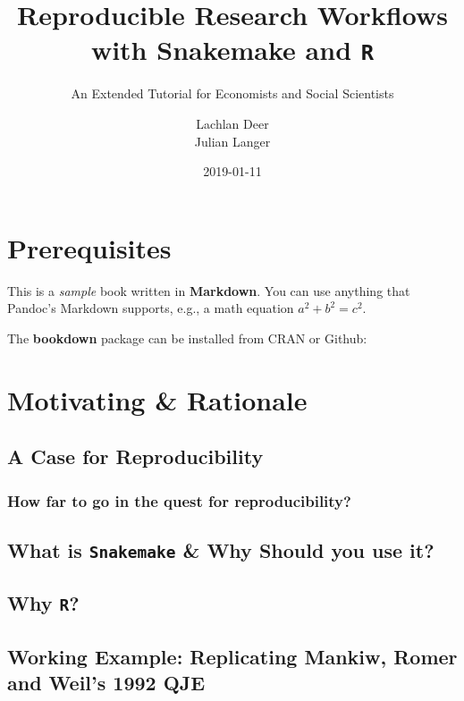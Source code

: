 \documentclass[]{book}
\title{Reproducible Research Workflows with Snakemake and \texttt{R}}
\subtitle{An Extended Tutorial for Economists and Social Scientists}
\author{Lachlan Deer \\ Julian Langer}
\date{2019-01-11}
\theoremstyle{definition}
\theoremstyle{definition}
\theoremstyle{definition}
\theoremstyle{remark}
\begin{document}
\maketitle

{
\setcounter{tocdepth}{1}
\tableofcontents
}
\chapter*{Prerequisites}\label{prerequisites}

This is a \emph{sample} book written in \textbf{Markdown}. You can use
anything that Pandoc's Markdown supports, e.g., a math equation
\(a^2 + b^2 = c^2\).

The \textbf{bookdown} package can be installed from CRAN or Github:

\chapter{Motivating \& Rationale}\label{intro}

\section{A Case for Reproducibility}\label{a-case-for-reproducibility}

\subsection{How far to go in the quest for
reproducibility?}\label{how-far-to-go-in-the-quest-for-reproducibility}

\section{\texorpdfstring{What is \texttt{Snakemake} \& Why Should you
use
it?}{What is Snakemake \& Why Should you use it?}}\label{what-is-snakemake-why-should-you-use-it}

\section{\texorpdfstring{Why \texttt{R}?}{Why R?}}\label{why-r}

\section{Working Example: Replicating Mankiw, Romer and Weil's 1992
QJE}\label{working-example-replicating-mankiw-romer-and-weils-1992-qje}
\end{document}
